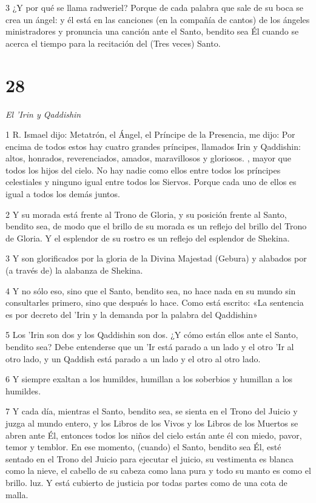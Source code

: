 \par 3 ¿Y por qué se llama radweriel? Porque de cada palabra que sale de su boca se crea un ángel: y él está en las canciones (en la compañía de cantos) de los ángeles ministradores y pronuncia una canción ante el Santo, bendito sea Él cuando se acerca el tiempo para la recitación del (Tres veces) Santo.

\chapter{28}

\par \textit{El 'Irin y Qaddishin}

\par 1 R. Ismael dijo: Metatrón, el Ángel, el Príncipe de la Presencia, me dijo: Por encima de todos estos hay cuatro grandes príncipes, llamados Irin y Qaddishin: altos, honrados, reverenciados, amados, maravillosos y gloriosos. , mayor que todos los hijos del cielo. No hay nadie como ellos entre todos los príncipes celestiales y ninguno igual entre todos los Siervos. Porque cada uno de ellos es igual a todos los demás juntos.

\par 2 Y su morada está frente al Trono de Gloria, y su posición frente al Santo, bendito sea, de modo que el brillo de su morada es un reflejo del brillo del Trono de Gloria. Y el esplendor de su rostro es un reflejo del esplendor de Shekina.

\par 3 Y son glorificados por la gloria de la Divina Majestad (Gebura) y alabados por (a través de) la alabanza de Shekina.

\par 4 Y no sólo eso, sino que el Santo, bendito sea, no hace nada en su mundo sin consultarles primero, sino que después lo hace. Como está escrito: «La sentencia es por decreto del 'Irin y la demanda por la palabra del Qaddishin»

\par 5 Los 'Irin son dos y los Qaddishin son dos. ¿Y cómo están ellos ante el Santo, bendito sea? Debe entenderse que un 'Ir está parado a un lado y el otro 'Ir al otro lado, y un Qaddish está parado a un lado y el otro al otro lado.

\par 6 Y siempre exaltan a los humildes, humillan a los soberbios y humillan a los humildes.

\par 7 Y cada día, mientras el Santo, bendito sea, se sienta en el Trono del Juicio y juzga al mundo entero, y los Libros de los Vivos y los Libros de los Muertos se abren ante Él, entonces todos los niños del cielo están ante él con miedo, pavor, temor y temblor. En ese momento, (cuando) el Santo, bendito sea Él, esté sentado en el Trono del Juicio para ejecutar el juicio, su vestimenta es blanca como la nieve, el cabello de su cabeza como lana pura y todo su manto es como el brillo. luz. Y está cubierto de justicia por todas partes como de una cota de malla.

